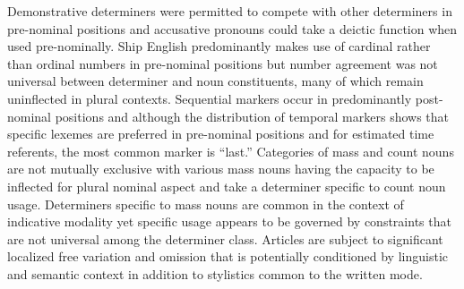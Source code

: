 Demonstrative determiners were permitted to compete with other determiners in pre-nominal positions and accusative pronouns could take a deictic function when used pre-nominally. Ship English predominantly makes use of cardinal rather than ordinal numbers in pre-nominal positions but number agreement was not universal between determiner and noun constituents, many of which remain uninflected in plural contexts. Sequential markers occur in predominantly post-nominal positions and although the distribution of temporal markers shows that specific lexemes are preferred in pre-nominal positions and for estimated time referents, the most common marker is “last.”  Categories of mass and count nouns are not mutually exclusive with various mass nouns having the capacity to be inflected for plural nominal aspect and take a determiner specific to count noun usage. Determiners specific to mass nouns are common in the context of indicative modality yet specific usage appears to be governed by constraints that are not universal among the determiner class.  Articles are subject to significant localized free variation and omission that is potentially conditioned by linguistic and semantic context in addition to stylistics common to the written mode.

